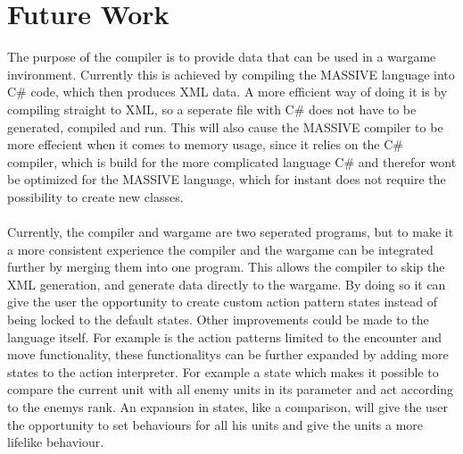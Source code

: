 \chapter{Future Work}
The purpose of the compiler is to provide data that can be used in a wargame invironment. 
Currently this is achieved by compiling the MASSIVE language into C\# code, which then produces XML data. 
A more efficient way of doing it is by compiling straight to XML, so a seperate file with C\# does not have to be generated, compiled and run. 
This will also cause the MASSIVE compiler to be more effecient when it comes to memory usage, since it relies on the C\# compiler, which is build for the more complicated language C\# and therefor wont be optimized for the MASSIVE language, which for instant does not require the possibility to create new classes.\\
\\
Currently, the compiler and wargame are two seperated programs, but to make it a more consistent experience the compiler and the wargame can be integrated further by merging them into one program.
This allows the compiler to skip the XML generation, and generate data directly to the wargame. By doing so it can give the user the opportunity to create custom action pattern states instead of being locked to the default states.\newline
Other improvements could be made to the language itself.
For example is the action patterns limited to the encounter and move functionality, these functionalitys can be further expanded by adding more states to the action interpreter. 
For example a state which makes it possible to compare the current unit with all enemy units in its parameter and act according to the enemys rank.
An expansion in states, like a comparison, will give the user the opportunity to set behaviours for all his units and give the units a more lifelike behaviour.\\
\\
